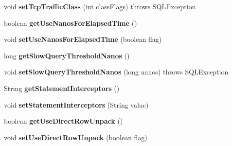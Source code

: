 \begin{DoxyCompactItemize}
void {\bfseries set\+Tcp\+Traffic\+Class} (int class\+Flags)  throws S\+Q\+L\+Exception
\item 
\mbox{\label{interfacecom_1_1mysql_1_1jdbc_1_1_connection_properties_ae7bfa849b5a4578ef8906546e635dfee}} 
boolean {\bfseries get\+Use\+Nanos\+For\+Elapsed\+Time} ()
\item 
\mbox{\label{interfacecom_1_1mysql_1_1jdbc_1_1_connection_properties_a4ad31ab8d3e65e3c5dc84e95203e60e2}} 
void {\bfseries set\+Use\+Nanos\+For\+Elapsed\+Time} (boolean flag)
\item 
\mbox{\label{interfacecom_1_1mysql_1_1jdbc_1_1_connection_properties_a036ac37c196fdf5ccf6fd1aa9c72fbff}} 
long {\bfseries get\+Slow\+Query\+Threshold\+Nanos} ()
\item 
\mbox{\label{interfacecom_1_1mysql_1_1jdbc_1_1_connection_properties_a3eba3b8291008b1976d9dcfb94085471}} 
void {\bfseries set\+Slow\+Query\+Threshold\+Nanos} (long nanos)  throws S\+Q\+L\+Exception
\item 
\mbox{\label{interfacecom_1_1mysql_1_1jdbc_1_1_connection_properties_af83bb9a64a60b92ea0fcb52ab31aec1d}} 
String {\bfseries get\+Statement\+Interceptors} ()
\item 
\mbox{\label{interfacecom_1_1mysql_1_1jdbc_1_1_connection_properties_a24cb52576e59c305054595539eb481bc}} 
void {\bfseries set\+Statement\+Interceptors} (String value)
\item 
\mbox{\label{interfacecom_1_1mysql_1_1jdbc_1_1_connection_properties_aa5b96b9a9b7261fd6175cca0f13d6da1}} 
boolean {\bfseries get\+Use\+Direct\+Row\+Unpack} ()
\item 
\mbox{\label{interfacecom_1_1mysql_1_1jdbc_1_1_connection_properties_a99101491ae31bd16f56478551a31a5cf}} 
void {\bfseries set\+Use\+Direct\+Row\+Unpack} (boolean flag)

\end{DoxyCompactItemize}
